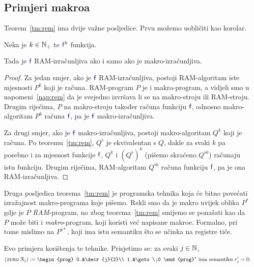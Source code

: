 \subsection{Primjeri makroa}
Teorem~\ref{tm:rem} ima dvije važne posljedice. Prvu možemo uobličiti kao korolar.

\begin{korolar}[{name=[RAM-izračunljivost je ekvivalentna makro-izračunljivosti]}]\label{kor:rem}
Neka je $k\in{\mathbb N}_+$ te $\f f^k$ funkcija.

    Tada je $\f f$ RAM-izračunljiva ako i samo ako je makro-izračunljiva.
\end{korolar}
\begin{proof}
Za jedan smjer, ako je $\f f$ RAM-izračunljiva, postoji RAM-algoritam iste mjesnosti $P^k$ koji je računa.  RAM-program $P$ je i makro-program, a vidjeli smo u napomeni~\ref{nap:rem} da je svejedno izvršava li se na makro-stroju ili RAM-stroju. Drugim riječima, $P$ na makro-stroju također računa funkciju $\f f$, odnosno makro-algoritam $P^k$ računa $\f f$, pa je $\f f$ makro-izračunljiva.

Za drugi smjer, ako je $\f f$ makro-izračunljiva, postoji makro-algoritam $Q^k$ koji je računa. Po teoremu~\ref{tm:rem}, $Q^\flat$ je ekvivalentan s $Q$, dakle za svaki $k$ pa posebno i za mjesnost funkcije $\f f$, $Q^k$ i $(Q^\flat)^k$ (pišemo skraćeno $Q^{\flat k}$) računaju istu funkciju. Drugim riječima, RAM-algoritam $Q^{\flat k}$ računa funkciju $\f f$, pa je ona RAM-izračunljiva.
\end{proof}

\begin{napomena}[{name=[makroi višeg reda]}]
Druga posljedica teorema~\ref{tm:rem} je programska tehnika koja će bitno povećati izražajnost makro-programa koje pišemo. Rekli smo da je makro uvijek oblika $P^*$ gdje je $P$ \emph{RAM}-program, no zbog teorema~\ref{tm:rem} smijemo se ponašati kao da $P$ može biti i \emph{makro}-program, koji koristi već napisane makroe. Formalno, pri tome mislimo na $P^{\flat*}$\!, koji ima istu semantiku što se učinka na registre tiče.
\end{napomena}


Evo primjera korištenja te tehnike.
Prisjetimo se: za svaki $j\in{\mathbb N}$,
\begin{equation}
(\textsc{zero}\;\reg{j}):=\begin{prog}
0.&\decr{j}{2}\\
1.&\goto\;0
\end{prog}^*\text{
 ima semantiku $r_j'=0$.}
\end{equation}

